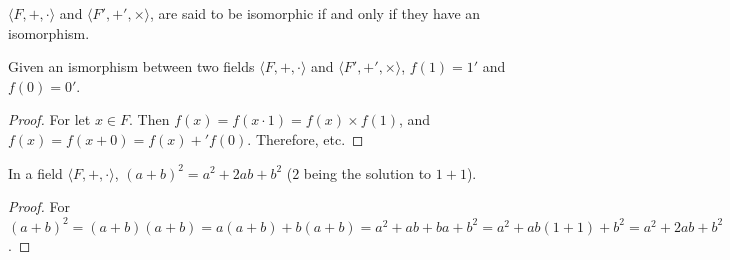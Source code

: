 \documentclass[crop=false,class=book,oneside]{standalone}
\begin{document}
        \begin{definition}
        $\langle F,+,\cdot \rangle$ and $\langle F', +',\times \rangle$, are said to be isomorphic if and only if they have an isomorphism.
        \end{definition}
        \begin{theorem}
        Given an ismorphism between two fields $\langle F,+,\cdot \rangle$ and $\langle F', +',\times \rangle$, $f(1) = 1'$ and $f(0) = 0'$.
        \end{theorem}
        \begin{proof}
        For let $x\in F$. Then $f(x)=f(x\cdot 1) = f(x)\times f(1)$, and $f(x)=f(x+0) = f(x)+'f(0)$. Therefore, etc.
        \end{proof}
        \begin{theorem}
        In a field $\langle F,+,\cdot \rangle$, $(a+ b)^2 = a^2 + 2ab + b^2$ ($2$ being the solution to $1+1$).
        \end{theorem}
        \begin{proof}
        For $(a+b)^2 = (a+b)(a+b) = a(a+b)+b(a+b) = a^2 + ab + ba + b^2 = a^2 +ab(1+1)+b^2 = a^2 + 2ab + b^2$.
        \end{proof}
\end{document}
